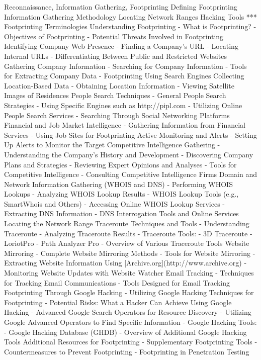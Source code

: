 Reconnaissance, Information Gathering, Footprinting
	Defining Footprinting
	Information Gathering Methodology
	Locating Network Ranges
	Hacking Tools
***
Footprinting Terminologies
Understanding Footprinting
    - What is Footprinting?
    - Objectives of Footprinting
    - Potential Threats Involved in Footprinting
Identifying Company Web Presence
    - Finding a Company’s URL
    - Locating Internal URLs
    - Differentiating Between Public and Restricted Websites
Gathering Company Information
    - Searching for Company Information
    - Tools for Extracting Company Data
    - Footprinting Using Search Engines
Collecting Location-Based Data
    - Obtaining Location Information
    - Viewing Satellite Images of Residences
People Search Techniques
    - General People Search Strategies
    - Using Specific Engines such as http://pipl.com
    - Utilizing Online People Search Services
    - Searching Through Social Networking Platforms
Financial and Job Market Intelligence
    - Gathering Information from Financial Services
    - Using Job Sites for Footprinting
Active Monitoring and Alerts
    - Setting Up Alerts to Monitor the Target
Competitive Intelligence Gathering
    - Understanding the Company’s History and Development
    - Discovering Company Plans and Strategies
    - Reviewing Expert Opinions and Analyses
    - Tools for Competitive Intelligence
    - Consulting Competitive Intelligence Firms
Domain and Network Information Gathering (WHOIS and DNS)
    - Performing WHOIS Lookups
    - Analyzing WHOIS Lookup Results
    - WHOIS Lookup Tools (e.g., SmartWhois and Others)
    - Accessing Online WHOIS Lookup Services
    - Extracting DNS Information
    - DNS Interrogation Tools and Online Services
Locating the Network Range
Traceroute Techniques and Tools
- Understanding Traceroute
- Analyzing Traceroute Results
- Traceroute Tools:
    - 3D Traceroute
    - LoriotPro
    - Path Analyzer Pro
- Overview of Various Traceroute Tools
Website Mirroring
- Complete Website Mirroring Methods
- Tools for Website Mirroring
- Extracting Website Information Using [Archive.org](http://www.archive.org)
- Monitoring Website Updates with Website Watcher
Email Tracking
- Techniques for Tracking Email Communications
- Tools Designed for Email Tracking
Footprinting Through Google Hacking
- Utilizing Google Hacking Techniques for Footprinting
- Potential Risks: What a Hacker Can Achieve Using Google Hacking
- Advanced Google Search Operators for Resource Discovery
- Utilizing Google Advanced Operators to Find Specific Information
- Google Hacking Tools:
    - Google Hacking Database (GHDB)
- Overview of Additional Google Hacking Tools
Additional Resources for Footprinting
- Supplementary Footprinting Tools
- Countermeasures to Prevent Footprinting
- Footprinting in Penetration Testing
